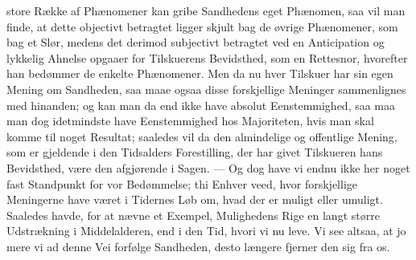 \documentclass[12pt]{book}
\begin{document}
store Række af Phænomener kan gribe Sandhedens eget Phænomen, saa vil man finde,
at dette objectivt betragtet ligger skjult bag de øvrige Phænomener, som bag et
Slør, medens det derimod subjectivt betragtet ved en Anticipation og lykkelig
Ahnelse opgaaer for Tilskuerens Bevidsthed, som en Rettesnor, hvorefter han
bedømmer de enkelte Phænomener. Men da nu hver Tilskuer har sin egen Mening om
Sandheden, saa maae ogsaa disse forskjellige Meninger sammenlignes med
hinanden; og kan man da end ikke have absolut Eenstemmighed, saa maa man dog
idetmindste have Eenstemmighed hos Majoriteten, hvis man skal komme til noget
Resultat; saaledes vil da den almindelige og offentlige Mening, som er gjeldende
i den Tidsalders Forestilling, der har givet Tilskueren hans Bevidsthed, være
den afgjørende i Sagen. --- Og dog have vi endnu ikke her noget fast Standpunkt
for vor Bedømmelse; thi Enhver veed, hvor forskjellige Meningerne have været i
Tidernes Løb om, hvad der er muligt eller umuligt. Saaledes havde, for at nævne
et Exempel, Mulighedens Rige en langt større Udstrækning i Middelalderen, end i
den Tid, hvori vi nu leve. Vi see altsaa, at jo mere vi ad denne Vei forfølge
Sandheden, desto længere fjerner den sig fra os.
\end{document}
